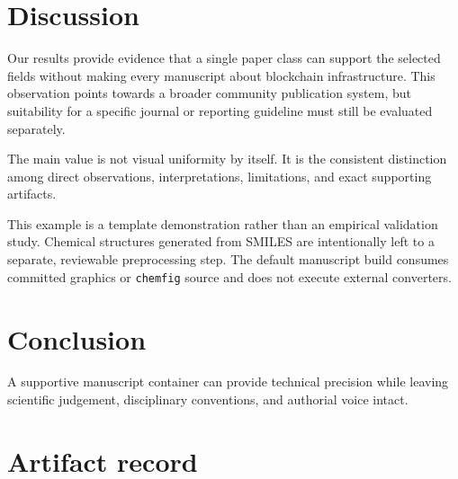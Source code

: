 \documentclass[
  blockchain,
  computerscience,
  chemistry,
  biochemistry,
  biology
]{genesisl1-paper}
\begin{document}
\section{Discussion}
Our results provide evidence that a single paper class can support the selected fields
without making every manuscript about blockchain infrastructure. This observation
points towards a broader community publication system, but suitability for a specific
journal or reporting guideline must still be evaluated separately.

\begin{GenesisInterpretation}
The main value is not visual uniformity by itself. It is the consistent distinction among
direct observations, interpretations, limitations, and exact supporting artifacts.
\end{GenesisInterpretation}

\begin{GenesisLimitations}
This example is a template demonstration rather than an empirical validation study.
Chemical structures generated from SMILES are intentionally left to a separate,
reviewable preprocessing step. The default manuscript build consumes committed
graphics or \texttt{chemfig} source and does not execute external converters.
\end{GenesisLimitations}

\section{Conclusion}
A supportive manuscript container can provide technical precision while leaving
scientific judgement, disciplinary conventions, and authorial voice intact.




\section*{Artifact record}

\PrintGenesisArtifactRecord

\GenesisEndMatterNotice

%


\end{document}
